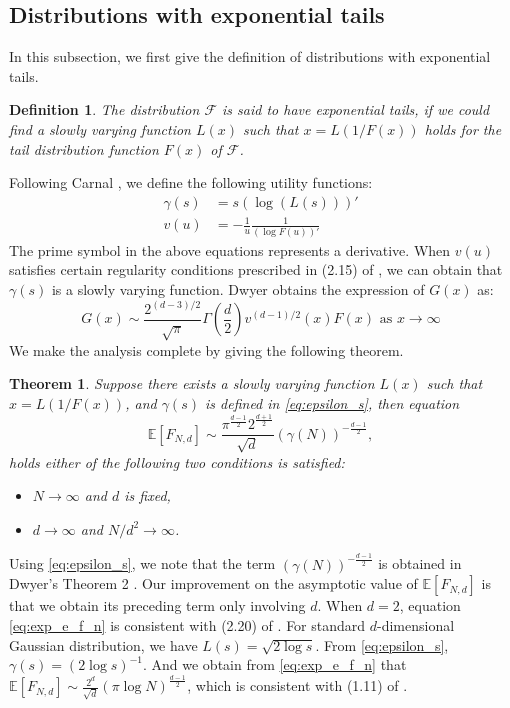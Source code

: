 \documentclass[conference,a4paper]{IEEEtran}
\def\E{\mathbb{E}}
\newtheorem{theorem}{Theorem}
\newtheorem{definition}{Definition}
\begin{document}
\subsection{Distributions with exponential tails}
In this subsection, we first give the definition of distributions with exponential tails.
\begin{definition}
 The distribution $\mathcal{F}$ is said to have exponential tails,
 if we could find
 a slowly varying function $L(x)$ such that
 $x = L(1/F(x))$ holds for the tail distribution function $F(x)$ of $\mathcal{F}$.
\end{definition}
Following Carnal \cite{carnal1970konvexe},
we define the following utility functions:
\begin{align}
     \gamma(s) & = s (\log (L(s)))' \label{eq:epsilon_s}\\
     v(u) &= -\frac{1}{u} \frac{1}{(\log F(u))'}    
\end{align}
The prime symbol in the above equations represents a derivative. When $v(u)$ satisfies
certain regularity conditions prescribed in (2.15) of \cite{carnal1970konvexe},
we can obtain that $\gamma(s)$ is a slowly varying function.
Dwyer \cite{dwyer1991convex} obtains the expression of $G(x)$ as:
\begin{equation}\label{eq:G_x_exp}
     G(x) \sim \frac{2^{(d-3)/2}}{\sqrt{\pi}}\Gamma\left(\frac{d}{2}\right)
     v^{(d-1)/2}(x) F(x)
      \textrm{ as } x\to \infty
\end{equation}
We make the analysis complete by giving the following theorem.
\begin{theorem}\label{thm:exponential_tails}
     Suppose there exists a slowly
     varying function $L(x)$ such that $x=L(1/F(x))$,
     and $\gamma(s)$ is defined in \eqref{eq:epsilon_s}, then
  equation
  \begin{equation}\label{eq:exp_e_f_n}
     \E[F_{N,d}]\sim \frac{\pi^{\frac{d-1}{2}} 2^{\frac{d+1}{2}}}{\sqrt{d}} (\gamma(N))^{-\frac{d-1}{2}},
 \end{equation}
 holds either of the following two conditions is satisfied:
  \begin{itemize}
     \item $N \to \infty$ and $d$ is fixed,     
     \item  $d\to\infty$ and $N/d^2\to \infty$.
  \end{itemize}
\end{theorem}
 Using \eqref{eq:epsilon_s}, we note that the term
 $(\gamma(N))^{-\frac{d-1}{2}}$
 is obtained in Dwyer's Theorem 2 \cite{dwyer1991convex}.
 Our improvement on the asymptotic value of $\E[F_{N,d}]$ is that we obtain its preceding term only involving $d$.
 When $d=2$, equation \eqref{eq:exp_e_f_n} is consistent with (2.20) of \cite{carnal1970konvexe}.
 For standard $d$-dimensional Gaussian distribution, we have $L(s)=\sqrt{2\log s}$.
 From \eqref{eq:epsilon_s}, $\gamma(s) = (2\log s)^{-1}$. And we obtain from \eqref{eq:exp_e_f_n}
 that $\E[F_{N,d}]\sim \frac{2^d}{\sqrt{d}}(\pi \log N)^{\frac{d-1}{2}}$,
 which is consistent with (1.11) of \cite{raynaud1970enveloppe}.
\end{document}
